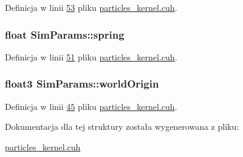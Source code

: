 Definicja w linii \hyperlink{particles__kernel_8cuh_source_l00053}{53} pliku \hyperlink{particles__kernel_8cuh_source}{particles\-\_\-kernel.\-cuh}.

\hypertarget{struct_sim_params_a301314921adc7bce20d8955cf03cdf3f}{
\subsubsection[{spring}]{\setlength{\rightskip}{0pt plus 5cm}float Sim\-Params\-::spring}}\label{struct_sim_params_a301314921adc7bce20d8955cf03cdf3f}


Definicja w linii \hyperlink{particles__kernel_8cuh_source_l00051}{51} pliku \hyperlink{particles__kernel_8cuh_source}{particles\-\_\-kernel.\-cuh}.

\hypertarget{struct_sim_params_a1ed7465773f15f2874650f19cec3d0a9}{
\subsubsection[{world\-Origin}]{\setlength{\rightskip}{0pt plus 5cm}float3 Sim\-Params\-::world\-Origin}}\label{struct_sim_params_a1ed7465773f15f2874650f19cec3d0a9}


Definicja w linii \hyperlink{particles__kernel_8cuh_source_l00045}{45} pliku \hyperlink{particles__kernel_8cuh_source}{particles\-\_\-kernel.\-cuh}.



Dokumentacja dla tej struktury została wygenerowana z pliku\-:\begin{DoxyCompactItemize}
\item 
\hyperlink{particles__kernel_8cuh}{particles\-\_\-kernel.\-cuh}\end{DoxyCompactItemize}
